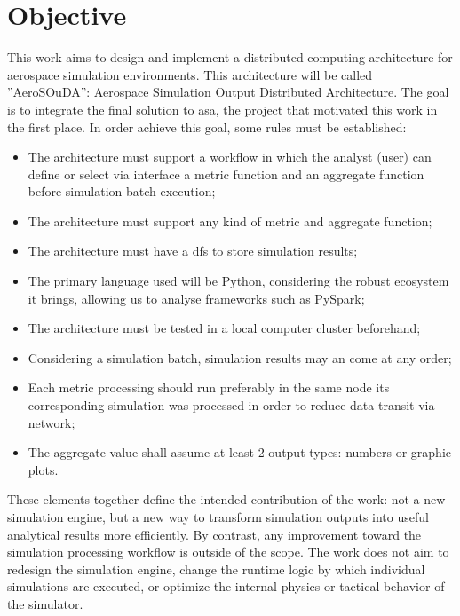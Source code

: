 \section{Objective}
\label{sec:cap1-objective}

\begin{sloppypar}
This work aims to design and implement a distributed computing architecture for aerospace simulation environments. This architecture will be called ''AeroSOuDA'': Aerospace Simulation Output Distributed Architecture. The goal is to integrate the final solution to \gls{asa}, the project that motivated this work in the first place. In order achieve this goal, some rules must be established:
\end{sloppypar}

\begin{itemize}
    \item The architecture must support a workflow in which the analyst (user) can define or select via interface a metric function and an aggregate function before simulation batch execution;
    \item The architecture must support any kind of metric and aggregate function;
    \item The architecture must have a \gls{dfs} to store simulation results;
    \item The primary language used will be Python, considering the robust ecosystem it brings, allowing us to analyse frameworks such as PySpark;
    \item The architecture must be tested in a local computer cluster beforehand;
    \item Considering a simulation batch, simulation results may an come at any order;
    \item Each metric processing should run preferably in the same node its corresponding simulation was processed in order to reduce data transit via network;
    \item The aggregate value shall assume at least 2 output types: numbers or graphic plots.
\end{itemize}

 These elements together define the intended contribution of the work: not a new simulation engine, but a new way to transform simulation outputs into useful analytical results more efficiently. By contrast, any improvement toward the simulation processing workflow is outside of the scope. The work does not aim to redesign the simulation engine, change the runtime logic by which individual simulations are executed, or optimize the internal physics or tactical behavior of the simulator. 
